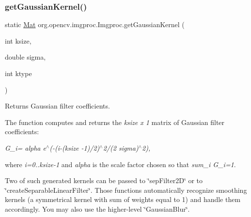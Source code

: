 \mbox{\label{classorg_1_1opencv_1_1imgproc_1_1_imgproc_a7f775ca4b4dd4c420a16a65ca28cbc58}} 
\subsubsection{\texorpdfstring{get\+Gaussian\+Kernel()}{getGaussianKernel()}\hspace{0.1cm}{\footnotesize\ttfamily [1/2]}}
{\footnotesize\ttfamily static \mbox{\hyperlink{classorg_1_1opencv_1_1core_1_1_mat}{Mat}} org.\+opencv.\+imgproc.\+Imgproc.\+get\+Gaussian\+Kernel (\begin{DoxyParamCaption}\item[{int}]{ksize,  }\item[{double}]{sigma,  }\item[{int}]{ktype }\end{DoxyParamCaption})\hspace{0.3cm}{\ttfamily [static]}}

Returns Gaussian filter coefficients.

The function computes and returns the {\itshape ksize x 1} matrix of Gaussian filter coefficients\+:

{\itshape G\+\_\+i= alpha {\itshape e$^\wedge$(-\/(i-\/(ksize -\/1)/2)$^\wedge$2/(2} sigma)$^\wedge$2),}

where {\itshape i=0..ksize-\/1} and {\itshape alpha} is the scale factor chosen so that {\itshape sum\+\_\+i G\+\_\+i=1}.

Two of such generated kernels can be passed to \char`\"{}sep\+Filter2\+D\char`\"{} or to \char`\"{}create\+Separable\+Linear\+Filter\char`\"{}. Those functions automatically recognize smoothing kernels (a symmetrical kernel with sum of weights equal to 1) and handle them accordingly. You may also use the higher-\/level \char`\"{}\+Gaussian\+Blur\char`\"{}.


